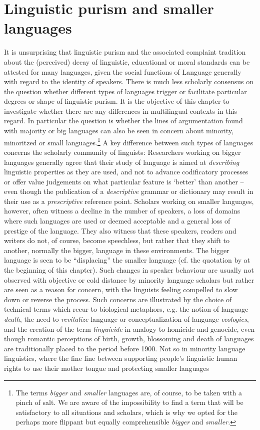 \documentclass[output=paper]{langsci/langscibook}
\begin{document}
\section{Linguistic purism and smaller languages}
\label{sec:gregersen:3}

It is unsurprising that linguistic purism and the associated complaint tradition about the (perceived) decay of linguistic, educational or moral standards can be attested for many languages, given the social functions of Language generally with regard to the identity of speakers. There is much less scholarly consensus on the question whether different types of languages trigger or facilitate particular degrees or shape of linguistic purism. It is the objective of this chapter to investigate whether there are any differences in multilingual contexts in this regard. In particular the question is whether the lines of argumentation found with majority or big languages can also be seen in concern about minority, minoritzed or small languages.\footnote{The terms \textit{bigger} and \textit{smaller} languages are, of course, to be taken with a pinch of salt. We are aware of the impossibility to find a term that will be satisfactory to all situations and scholars, which is why we opted for the perhaps more flippant but equally comprehensible \textit{bigger} and \textit{smaller.}} A key difference between such types of languages concerns the scholarly community of linguists: Researchers working on bigger languages generally agree that their study of language is aimed at \textit{describing} linguistic properties as they are used, and not to advance codificatory processes or offer value judgements on what particular feature is ‘better’ than another – even though the publication of a \textit{descriptive} grammar or dictionary may result in their use as a \textit{prescriptive} reference point. Scholars working on smaller languages, however, often witness a decline in the number of speakers, a loss of domains where such languages are used or deemed acceptable and a general loss of prestige of the language. They also witness that these speakers, readers and writers do not, of course, become speechless, but rather that they shift to another, normally the bigger, language in these environments. The bigger language is seen to be “displacing” the smaller language (cf. the quotation by \citealt{Laabs2009} at the beginning of this chapter). Such changes in speaker behaviour are usually not observed with objective or cold distance by minority language scholars but rather are seen as a reason for concern, with the linguists feeling compelled to slow down or reverse the process. Such concerns are illustrated by the choice of technical terms which recur to biological metaphors, e.g. the notion of language \textit{death}, the need to \textit{revitalize} language or conceptualization of language \textit{ecologies}, and the creation of the term \textit{linguicide} in analogy to homicide and genocide, even though romantic perceptions of birth, growth, blossoming and death of languages are traditionally placed to the period before 1900. Not so in minority language linguistics, where the fine line between supporting people’s linguistic human rights to use their mother tongue and protecting smaller languages 
\end{document}
